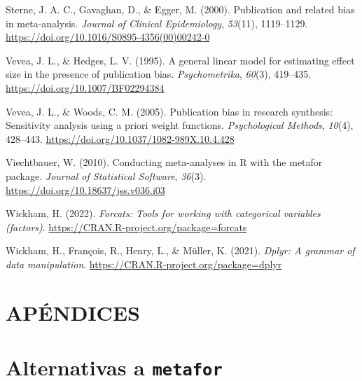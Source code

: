 \documentclass[
  bookmarksnumbered]{article}
\newlength{\cslhangindent}
\newlength{\cslentryspacingunit} %
\newenvironment{CSLReferences}[2] %
 {%
  \setlength{\parindent}{0pt}
  \ifodd #1
  \let\oldpar\par
  \def\par{\hangindent=\cslhangindent\oldpar}
  \fi
  \setlength{\parskip}{#2\cslentryspacingunit}
 }%
 {}
\begin{document}
\begin{CSLReferences}{1}{0}
\leavevmode{}%
Sterne, J. A. C., Gavaghan, D., \& Egger, M. (2000). Publication and related bias in meta-analysis. \emph{Journal of Clinical Epidemiology}, \emph{53}(11), 1119--1129. \url{https://doi.org/10.1016/S0895-4356(00)00242-0}

\leavevmode{}%
Vevea, J. L., \& Hedges, L. V. (1995). A general linear model for estimating effect size in the presence of publication bias. \emph{Psychometrika}, \emph{60}(3), 419--435. \url{https://doi.org/10.1007/BF02294384}

\leavevmode{}%
Vevea, J. L., \& Woods, C. M. (2005). Publication bias in research synthesis: Sensitivity analysis using a priori weight functions. \emph{Psychological Methods}, \emph{10}(4), 428--443. \url{https://doi.org/10.1037/1082-989X.10.4.428}

\leavevmode{}%
Viechtbauer, W. (2010). Conducting meta-analyses in {R} with the metafor package. \emph{Journal of Statistical Software}, \emph{36}(3). \url{https://doi.org/10.18637/jss.v036.i03}

\leavevmode{}%
Wickham, H. (2022). \emph{Forcats: Tools for working with categorical variables (factors)}. \url{https://CRAN.R-project.org/package=forcats}

\leavevmode{}%
Wickham, H., François, R., Henry, L., \& Müller, K. (2021). \emph{Dplyr: A grammar of data manipulation}. \url{https://CRAN.R-project.org/package=dplyr}

\end{CSLReferences}

\hypertarget{apuxe9ndices}{%
\section*{APÉNDICES}\label{apuxe9ndices}}

\hypertarget{appendix-appendix}{%
\appendix}


\hypertarget{alternativas-a-metafor}{%
\section{\texorpdfstring{Alternativas a \texttt{metafor}}{Alternativas a metafor}}\label{alternativas-a-metafor}}
\end{document}
